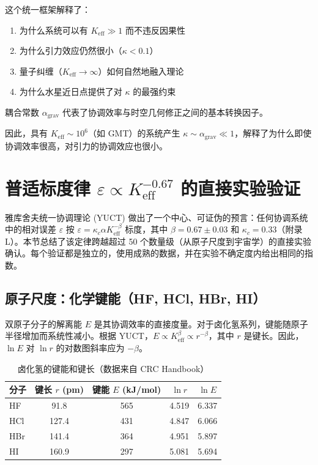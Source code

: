 \documentclass[11pt,a4paper]{article}
\begin{document}
	这个统一框架解释了：
	\begin{enumerate}
		\item 为什么系统可以有 $K_{\mathrm{eff}} \gg 1$ 而不违反因果性
		\item 为什么引力效应仍然很小（$\kappa < 0.1$）
		\item 量子纠缠（$K_{\mathrm{eff}} \to\infty$）如何自然地融入理论
		\item 为什么水星近日点提供了对 $\kappa$ 的最强约束
	\end{enumerate}
	
	耦合常数 $\alpha_{\text{grav}}$ 代表了协调效率与时空几何修正之间的基本转换因子。
	
	因此，具有 $K_{\mathrm{eff}} \sim 10^6$（如 GMT）的系统产生 $\kappa \sim \alpha_{\text{grav}} \ll 1$，解释了为什么即使协调效率很高，对引力的协调效应也很小。
	
	\section{普适标度律 \(\varepsilon \propto K_{\mathrm{eff}}^{-0.67}\) 的直接实验验证}
	\label{sec:experimental-verifications}
	
	雅库舍夫统一协调理论 (YUCT) 做出了一个中心、可证伪的预言：任何协调系统中的相对误差 \(\varepsilon\) 按 \(\varepsilon = \kappa_c \alpha K_{\mathrm{eff}}^{-\beta}\) 标度，其中 \(\beta = 0.67 \pm 0.03\) 和 \(\kappa_c = 0.33\)（附录 L）。本节总结了该定律跨越超过 50 个数量级（从原子尺度到宇宙学）的直接实验确认。每个验证都是独立的，使用成熟的数据，并在实验不确定度内给出相同的指数。
	
	\subsection{原子尺度：化学键能（HF, HCl, HBr, HI）}
	\label{subsec:chem-bonds}
	
	双原子分子的解离能 \(E\) 是其协调效率的直接度量。对于卤化氢系列，键能随原子半径增加而系统性减小。根据 YUCT，\(E \propto K_{\mathrm{eff}}^{\beta} \propto r^{-\beta}\)，其中 \(r\) 是键长。因此，\(\ln E\) 对 \(\ln r\) 的对数图斜率应为 \(-\beta\)。
	
	\begin{table}[htbp]
		\centering
		\caption{卤化氢的键能和键长（数据来自 CRC Handbook）}
		\label{tab:bond-data}
		\begin{tabular}{lcccc}
			\toprule
			分子 & 键长 $r$ (pm) & 键能 $E$ (kJ/mol) & $\ln r$ & $\ln E$ \\
			\midrule
			HF   & 91.8 & 565 & 4.519 & 6.337 \\
			HCl  & 127.4 & 431 & 4.847 & 6.066 \\
			HBr  & 141.4 & 364 & 4.951 & 5.897 \\
			HI   & 160.9 & 297 & 5.081 & 5.694 \\
			\bottomrule
		\end{tabular}
	\end{table}
	
\end{document}
